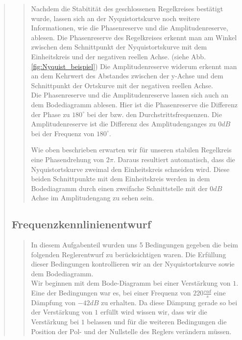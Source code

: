 \begin{quote}
\begin{quote}
        
        Nachdem die Stabitität des geschlossenen Regelkreises bestätigt wurde, lassen sich an der Nyquistortskurve noch weitere
        Informationen, wie die Phasenreserve und die Amplitudenreserve, ablesen. Die Phasenreserve des Regelkreises erkennt
        man am Winkel zwischen dem Schnittpunkt der Nyquistortskurve mit dem Einheitskreis und der negativen reellen
        Achse. (siehe Abb. \ref{fig:Nyquist_beispiel}) Die Amplitudenreserve widerum erkennt man an dem Kehrwert des Abstandes
        zwischen der y-Achse und dem Schnittpunkt der Ortskurve mit der negativen reellen Achse.\\
        Die Phasenreserve und die Amplitudenreserve lassen sich auch an dem Bodediagramm ablesen. Hier ist die
        Phasenreserve die Differenz der Phase zu $180^{\circ}$ bei der bzw. den Durchstrittsfrequenzen. Die Amplitudenreserve
        ist die Differenz des Amplitudenganges zu $0dB$ bei der Frequenz von $180^{\circ}$.\vspace{1em}
        
        Wie oben beschrieben erwarten wir für unseren stabilen Regelkreis eine Phasendrehung von $2\pi$. Daraus resultiert
        automatisch, dass die Nyquistortskurve zweimal den Einheitskreis schneiden wird. Diese beiden Schnittpunkte mit dem
        Einheitskreis werden in dem Bodediagramm durch einen zweifache Schnittstelle mit der $0dB$ Achse im Amplitudengang zu
        sehen sein.\\
        
        
        
    \end{quote} %
    
    \subsection{Frequenzkennlinienentwurf}
    \begin{quote}
        In diesem Aufgabenteil wurden uns 5 Bedingungen gegeben die beim folgenden Reglerentwurf zu berücksichtigen
        waren. Die Erfüllung dieser Bedingungen kontrollieren wir an der Nyquistortskurve sowie dem Bodediagramm.\\
        Wir beginnen mit dem Bode-Diagramm bei einer Verstärkung von $1$. Eine der Bedingungen war es, bei einer Frequenz
        von $220 \frac{rad}{s}$ eine Dämpfung von $-42 dB$ zu erhalten. Da diese Dämpung gerade so bei der Verstärkung
        von $1$ erfüllt wird wissen wir, dass wir die Verstärkung bei $1$ belassen und für die weiteren Bedingungen die
        Position der Pol- und der Nullstelle des Reglers verändern müssen.\vspace{1em}
        

\end{quote}
\end{quote}
